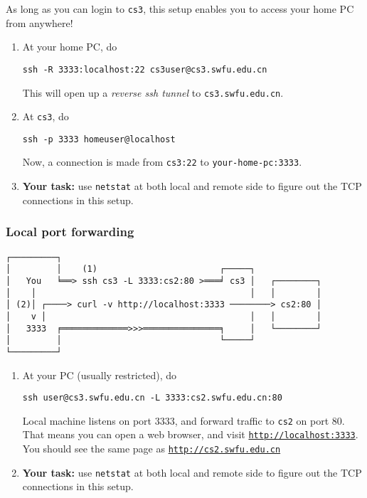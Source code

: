 \documentclass{article} [NO-DEFAULT-PACKAGES] \usepackage{wx672hyperref}
\begin{document}
As long as you can login to \texttt{cs3}, this setup enables you to access your home PC from
anywhere!

\begin{enumerate}
\item At your home PC, do
\begin{verbatim}
ssh -R 3333:localhost:22 cs3user@cs3.swfu.edu.cn
\end{verbatim}

This will open up a \emph{reverse ssh tunnel} to \texttt{cs3.swfu.edu.cn}.
\item At \texttt{cs3}, do
\begin{verbatim}
ssh -p 3333 homeuser@localhost
\end{verbatim}

Now, a connection is made from \texttt{cs3:22} to \texttt{your-home-pc:3333}.
\item \textbf{Your task:} use \texttt{netstat} at both local and remote side to figure out the TCP
connections in this setup.
\end{enumerate}

\subsubsection{Local port forwarding}
\label{sec:org0c544c4}

\verbatimfont{\small\dejavu}
\begin{verbatim}
┌─────────┐
│         │    (1)                        ┌─────┐
│   You   ╘══> ssh cs3 -L 3333:cs2:80 >═══╛ cs3 │   ┌────────┐
│    │                                          │   │        │
│ (2)│ ┌────> curl -v http://localhost:3333 ────────> cs2:80 │
│    v │                                        │   │        │
│   3333  ╒═════════════>>>═══════════════╕     │   └────────┘
│         │                               └─────┘
└─────────┘
\end{verbatim}

\begin{enumerate}
\item At your PC (usually restricted), do
\begin{verbatim}
ssh user@cs3.swfu.edu.cn -L 3333:cs2.swfu.edu.cn:80
\end{verbatim}

Local machine listens on port 3333, and forward traffic to \texttt{cs2} on port 80.  That
means you can open a web browser, and visit \href{http://localhost:3333}{\texttt{http://localhost:3333}}. You should see
the same page as \href{http://cs2.swfu.edu.cn}{\texttt{http://cs2.swfu.edu.cn}}
\item \textbf{Your task:} use \texttt{netstat} at both local and remote side to figure out the TCP
connections in this setup.
\end{enumerate}
\end{document}
